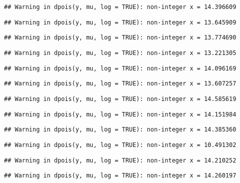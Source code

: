 \documentclass[
]{article}
\begin{document}
\begin{verbatim}
## Warning in dpois(y, mu, log = TRUE): non-integer x = 14.396609
\end{verbatim}

\begin{verbatim}
## Warning in dpois(y, mu, log = TRUE): non-integer x = 13.645909
\end{verbatim}

\begin{verbatim}
## Warning in dpois(y, mu, log = TRUE): non-integer x = 13.774690
\end{verbatim}

\begin{verbatim}
## Warning in dpois(y, mu, log = TRUE): non-integer x = 13.221305
\end{verbatim}

\begin{verbatim}
## Warning in dpois(y, mu, log = TRUE): non-integer x = 14.096169
\end{verbatim}

\begin{verbatim}
## Warning in dpois(y, mu, log = TRUE): non-integer x = 13.607257
\end{verbatim}

\begin{verbatim}
## Warning in dpois(y, mu, log = TRUE): non-integer x = 14.585619
\end{verbatim}

\begin{verbatim}
## Warning in dpois(y, mu, log = TRUE): non-integer x = 14.151984
\end{verbatim}

\begin{verbatim}
## Warning in dpois(y, mu, log = TRUE): non-integer x = 14.385360
\end{verbatim}

\begin{verbatim}
## Warning in dpois(y, mu, log = TRUE): non-integer x = 10.491302
\end{verbatim}

\begin{verbatim}
## Warning in dpois(y, mu, log = TRUE): non-integer x = 14.210252
\end{verbatim}

\begin{verbatim}
## Warning in dpois(y, mu, log = TRUE): non-integer x = 14.260197
\end{verbatim}
\end{document}
